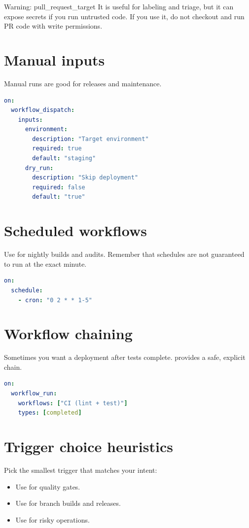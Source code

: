 \begin{warningbox}{Warning: pull\_request\_target}
It is useful for labeling and triage, but it can expose secrets if you run untrusted code.
If you use it, do not checkout and run PR code with write permissions.
\end{warningbox}

\section{Manual inputs}
Manual runs are good for releases and maintenance.

\begin{lstlisting}[language=YAML]
on:
  workflow_dispatch:
    inputs:
      environment:
        description: "Target environment"
        required: true
        default: "staging"
      dry_run:
        description: "Skip deployment"
        required: false
        default: "true"
\end{lstlisting}

\section{Scheduled workflows}
Use  for nightly builds and audits.
Remember that schedules are not guaranteed to run at the exact minute.

\begin{lstlisting}[language=YAML]
on:
  schedule:
    - cron: "0 2 * * 1-5"
\end{lstlisting}

\section{Workflow chaining}
Sometimes you want a deployment after tests complete.
 provides a safe, explicit chain.

\begin{lstlisting}[language=YAML]
on:
  workflow_run:
    workflows: ["CI (lint + test)"]
    types: [completed]
\end{lstlisting}

\section{Trigger choice heuristics}
Pick the smallest trigger that matches your intent:
\begin{itemize}[nosep]
  \item Use  for quality gates.
  \item Use  for branch builds and releases.
  \item Use  for risky operations.
\end{itemize}

